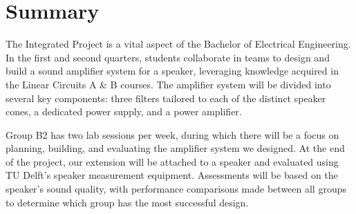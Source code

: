 \chapter*{Summary}

\par{The Integrated Project is a vital aspect of the Bachelor of Electrical Engineering. In the first and second quarters, students collaborate in teams to design and build a sound amplifier system for a speaker, leveraging knowledge acquired in the Linear Circuits A \& B courses. The amplifier system will be divided into several key components: three filters tailored to each of the distinct speaker cones, a dedicated power supply, and a power amplifier.

Group B2 has two lab sessions per week, during which there will be a focus on planning, building, and evaluating the amplifier system we designed. At the end of the project, our extension will be attached to a speaker and evaluated using TU Delft's speaker measurement equipment. Assessments will be based on the speaker's sound quality, with performance comparisons made between all groups to determine which group has the most successful design.}